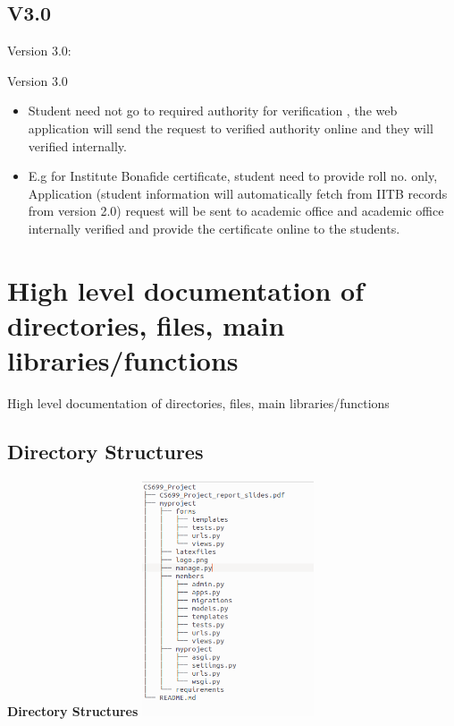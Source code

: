 \documentclass [] {beamer}
\begin{document}
\subsection{V3.0}
\begin{frame}{Version 3.0:}

\begin{block}{Version 3.0}
 \begin{itemize}
     \item   Student need not go to required authority for verification , the web application will send the request to verified authority online and they will verified internally.
     \item
     E.g for Institute Bonafide certificate, student need to provide roll no. only, Application (student information will automatically fetch from IITB records from version 2.0) request will be sent to academic office and academic office internally verified and provide the certificate online to the students.
     
 \end{itemize}
\end{block}

\end{frame}





\section{High level documentation of directories, files, main libraries/functions}

\begin{frame}{High level documentation of directories, files, main libraries/functions}

\subsection{Directory Structures}
\textbf{Directory Structures}
\includegraphics[width=2in]{directory.png}
\end{frame}
\end{document}
